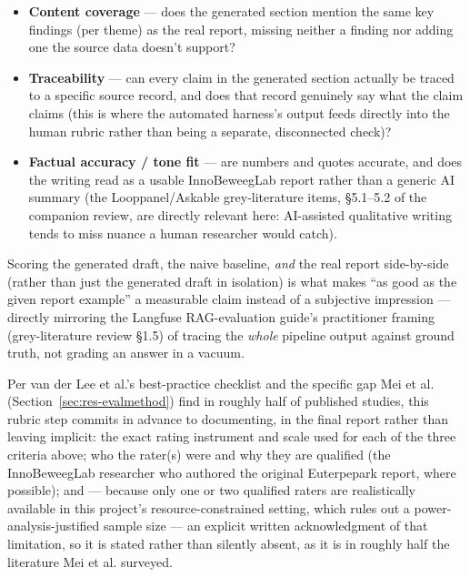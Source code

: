 \begin{enumerate}
\begin{itemize}
\item \textbf{Content coverage} — does the generated section mention the same key findings (per theme) as the real report, missing neither a finding nor adding one the source data doesn't support?
\item \textbf{Traceability} — can every claim in the generated section actually be traced to a specific source record, and does that record genuinely say what the claim claims (this is where the automated harness's output feeds directly into the human rubric rather than being a separate, disconnected check)?
\item \textbf{Factual accuracy / tone fit} — are numbers and quotes accurate, and does the writing read as a usable InnoBeweegLab report rather than a generic AI summary (the Looppanel/Askable grey-literature items, \S5.1–5.2 of the companion review, are directly relevant here: AI-assisted qualitative writing tends to miss nuance a human researcher would catch).
\end{itemize}
\end{enumerate}

Scoring the generated draft, the naive baseline, \textit{and} the real report side-by-side (rather than just the generated draft in isolation) is what makes \textquotedblleft{}as good as the given report example\textquotedblright{} a measurable claim instead of a subjective impression — directly mirroring the Langfuse RAG-evaluation guide's practitioner framing (grey-literature review \S1.5) of tracing the \textit{whole} pipeline output against ground truth, not grading an answer in a vacuum.



Per van der Lee et al.'s best-practice checklist and the specific gap Mei et al. (Section~\ref{sec:res-evalmethod}) find in roughly half of published studies, this rubric step commits in advance to documenting, in the final report rather than leaving implicit: the exact rating instrument and scale used for each of the three criteria above; who the rater(s) were and why they are qualified (the InnoBeweegLab researcher who authored the original Euterpepark report, where possible); and — because only one or two qualified raters are realistically available in this project's resource-constrained setting, which rules out a power-analysis-justified sample size — an explicit written acknowledgment of that limitation, so it is stated rather than silently absent, as it is in roughly half the literature Mei et al. surveyed.



